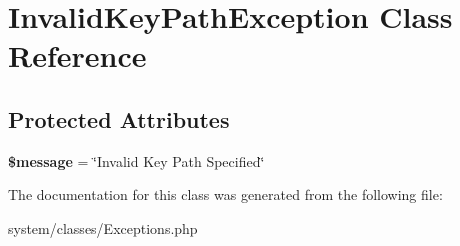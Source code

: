 \hypertarget{class_invalid_key_path_exception}{
\section{InvalidKeyPathException Class Reference}
\label{class_invalid_key_path_exception}
}
\subsection*{Protected Attributes}
\begin{DoxyCompactItemize}
\item 
\hypertarget{class_invalid_key_path_exception_abf17cb2dba2ed17cb28aa5f37deb5293}{
{\bfseries \$message} = \char`\"{}Invalid Key Path Specified\char`\"{}}
\label{class_invalid_key_path_exception_abf17cb2dba2ed17cb28aa5f37deb5293}

\end{DoxyCompactItemize}


The documentation for this class was generated from the following file:\begin{DoxyCompactItemize}
\item 
system/classes/Exceptions.php\end{DoxyCompactItemize}
